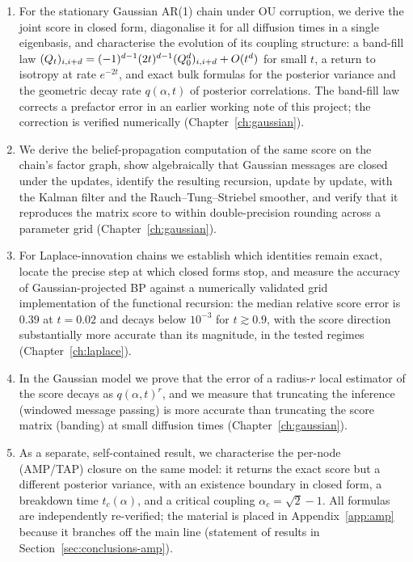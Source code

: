 \begin{enumerate}
  \item For the stationary Gaussian AR(1) chain under OU corruption, we
  derive the joint score in closed form, diagonalise it for all
  diffusion times in a single eigenbasis, and characterise the evolution
  of its coupling structure: a band-fill law
  $(Q_t)_{i,i+d} = (-1)^{d-1}(2t)^{d-1}(Q_0^d)_{i,i+d} + O(t^d)$ for
  small $t$, a return to isotropy at rate $e^{-2t}$, and exact bulk
  formulas for the posterior variance and the geometric decay rate
  $q(\alpha, t)$ of posterior correlations. The band-fill law corrects a
  prefactor error in an earlier working note of this project; the
  correction is verified numerically (Chapter~\ref{ch:gaussian}).

  \item We derive the belief-propagation computation of the same score
  on the chain's factor graph, show algebraically that Gaussian messages
  are closed under the updates, identify the resulting recursion, update
  by update, with the Kalman filter and the Rauch--Tung--Striebel
  smoother, and verify that it reproduces the matrix score to within
  double-precision rounding across a parameter grid
  (Chapter~\ref{ch:gaussian}).

  \item For Laplace-innovation chains we establish which identities
  remain exact, locate the precise step at which closed forms stop, and
  measure the accuracy of Gaussian-projected BP against a numerically
  validated grid implementation of the functional recursion: the median
  relative score error is $0.39$ at $t = 0.02$ and decays below
  $10^{-3}$ for $t \gtrsim 0.9$, with the score direction substantially
  more accurate than its magnitude, in the tested regimes
  (Chapter~\ref{ch:laplace}).

  \item In the Gaussian model we prove that the error of a radius-$r$
  local estimator of the score decays as $q(\alpha,t)^r$, and we measure
  that truncating the inference (windowed message passing) is more
  accurate than truncating the score matrix (banding) at small diffusion
  times (Chapter~\ref{ch:gaussian}).

  \item As a separate, self-contained result, we characterise the
  per-node (AMP/TAP) closure on the same model: it returns the exact
  score but a different posterior variance, with an existence boundary
  in closed form, a breakdown time $t_c(\alpha)$, and a critical
  coupling $\alpha_c = \sqrt{2} - 1$. All formulas are independently
  re-verified; the material is placed in Appendix~\ref{app:amp} because
  it branches off the main line (statement of results in
  Section~\ref{sec:conclusions-amp}).
\end{enumerate}

